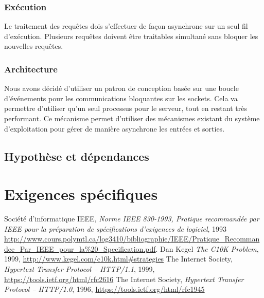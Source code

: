 \documentclass{scrreprt}
\begin{document}
\subsection{Exécution}
Le traitement des requêtes dois s'effectuer de façon asynchrone sur un seul fil
d'exécution. Plusieurs requêtes doivent être traitables simultané sans bloquer
les nouvelles requêtes.
\subsection{Architecture}
Nous avons décidé d'utiliser un patron de conception basée sur
une boucle d’événements pour les communications bloquantes sur les sockets. Cela va permettre d'utiliser qu'un seul processus pour le serveur, tout en restant très
performant.
Ce mécanisme permet d'utiliser des mécanismes existant du système d'exploitation
pour gérer de manière asynchrone les entrées et sorties\cite{c10k}.

\section{Hypothèse et dépendances}
\chapter{Exigences spécifiques}

\begin{thebibliography}{9}
  Société d'informatique IEEE,
\emph{Norme IEEE 830-1993, Pratique recommandée par IEEE pour la préparation de
spécifications d’exigences de logiciel}, 1993
\url{http://www.cours.polymtl.ca/log3410/bibliographie/IEEE/Pratique_Recommandee_Par_IEEE_pour_la%20_Specification.pdf}.
  Dan Kegel
\emph{The C10K Problem}, 1999, \url{http://www.kegel.com/c10k.html#strategies}
    The Internet Society,
\emph{Hypertext Transfer Protocol -- HTTP/1.1}, 1999,
\url{https://tools.ietf.org/html/rfc2616}
    The Internet Society,
\emph{Hypertext Transfer Protocol -- HTTP/1.0}, 1996,
\url{https://tools.ietf.org/html/rfc1945}
\end{thebibliography}

\end{document}
